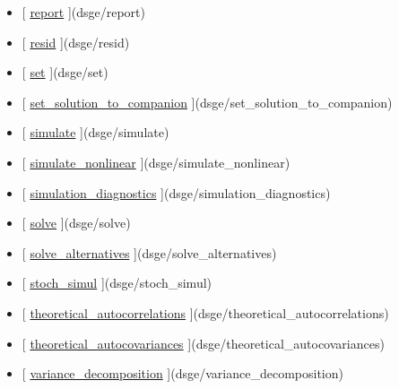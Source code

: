 \documentclass[letterpaper,10pt,english]{sphinxmanual}
\begin{document}
\begin{itemize}
\item {} 
{[} {\hyperref[classes/models/@dsge/dsge:report]{report}} {]}(dsge/report)

\item {} 
{[} {\hyperref[classes/models/@dsge/dsge:resid]{resid}} {]}(dsge/resid)

\item {} 
{[} {\hyperref[classes/models/@dsge/dsge:set]{set}} {]}(dsge/set)

\item {} 
{[} {\hyperref[classes/models/@dsge/dsge:set-solution-to-companion]{set\_solution\_to\_companion}} {]}(dsge/set\_solution\_to\_companion)

\item {} 
{[} {\hyperref[classes/models/@dsge/dsge:simulate]{simulate}} {]}(dsge/simulate)

\item {} 
{[} {\hyperref[classes/models/@dsge/dsge:simulate-nonlinear]{simulate\_nonlinear}} {]}(dsge/simulate\_nonlinear)

\item {} 
{[} {\hyperref[classes/models/@dsge/dsge:simulation-diagnostics]{simulation\_diagnostics}} {]}(dsge/simulation\_diagnostics)

\item {} 
{[} {\hyperref[classes/models/@dsge/dsge:solve]{solve}} {]}(dsge/solve)

\item {} 
{[} {\hyperref[classes/models/@dsge/dsge:solve-alternatives]{solve\_alternatives}} {]}(dsge/solve\_alternatives)

\item {} 
{[} {\hyperref[classes/models/@dsge/dsge:stoch-simul]{stoch\_simul}} {]}(dsge/stoch\_simul)

\item {} 
{[} {\hyperref[classes/models/@dsge/dsge:theoretical-autocorrelations]{theoretical\_autocorrelations}} {]}(dsge/theoretical\_autocorrelations)

\item {} 
{[} {\hyperref[classes/models/@dsge/dsge:theoretical-autocovariances]{theoretical\_autocovariances}} {]}(dsge/theoretical\_autocovariances)

\item {} 
{[} {\hyperref[classes/models/@dsge/dsge:variance-decomposition]{variance\_decomposition}} {]}(dsge/variance\_decomposition)

\end{itemize}
\end{document}
